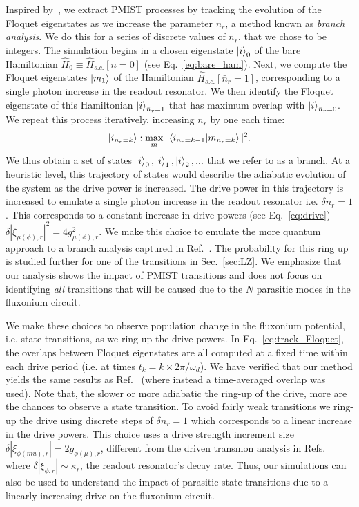 \documentclass[%
reprint,
superscriptaddress,
 amsmath,amssymb,
 aps,
 prx,
longbibliography,
floatfix,
]{revtex4-2}
\begin{document}
Inspired by~\cite{dumas2024unified,cohen2023reminiscence}, we extract PMIST processes by tracking the evolution of  the Floquet eigenstates as we increase the parameter $\bar{n}_r$, a method known as \emph{branch analysis}. 
We do this for a series of discrete values of $\bar{n}_r$, that we chose to be integers.  The simulation begins in a chosen eigenstate $\ket{i}_0$ of the bare Hamiltonian $\hat{H}_0 \equiv \hat{H}_{s.c.}[\bar{n}=0]$ (see Eq.~\ref{eq:bare_ham}). 
Next, we compute the Floquet eigenstates $\ket{m_1}$ of the Hamiltonian $\hat{H}_{s.c.}[\bar{n}_r=1]$,
corresponding to a single photon increase in the readout resonator. We then identify the Floquet eigenstate of this Hamiltonian $\ket{i}_{\bar n_r=1}$ that has maximum overlap with $\ket{i}_{\bar n_r=0}$.  We repeat this process iteratively, increasing $\bar{n}_r$ by one each time:
\begin{align}
\ket{i_{\bar n_r=k}}:\max_{m}|\braket{i_{\bar n_r=k-1}|{m}_{\bar n_r=k}}|^2.\label{eq:track_Floquet}   
\end{align}
We thus obtain a set of states $\ket{i}_0,\ket{i}_1,\ket{i}_2,...$ that we refer to as a branch.  At a heuristic level, this trajectory of states would describe the adiabatic evolution of the system as the drive power is increased. The drive power in this trajectory is increased to emulate a single photon increase in the readout resonator i.e. $\delta \bar n_r=1$. This corresponds to a constant increase in drive powers (see Eq.~\ref{eq:drive}) $\delta |\xi_{\mu (\phi),r}|^2=4g_{\mu (\phi),r}^2$. We make this choice to emulate the more quantum approach to a branch analysis captured in Ref.~\cite{shillito2022dynamics,dumas2024unified}. The probability for this ring up is studied further for one of the transitions in Sec.~\ref{sec:LZ}. We emphasize that our analysis shows the impact of PMIST transitions and does not focus on identifying \emph{all} transitions that will be caused due to the $N$ parasitic modes in the fluxonium circuit.



We make these choices to observe population change in the fluxonium potential, i.e. state transitions, as we ring up the drive powers. In Eq.~\ref{eq:track_Floquet}, the overlaps between Floquet eigenstates are all computed at a fixed time within each drive period (i.e. at times $t_k = k \times 2 \pi / \omega_d$).  We have verified that our method yields the same results as Ref.~\cite{dumas2024unified} (where instead a time-averaged overlap was used). Note that, the slower or more adiabatic the ring-up of the drive, more are the chances to observe a state transition. To avoid fairly weak transitions we ring-up the drive using discrete steps of $\delta \bar n_r=1$ which corresponds to a linear increase in the drive powers. This choice uses a drive strength increment size $\delta 
|{\xi}_{\phi (
mu
),r}|= 2g_{
\phi(\mu),r} 
$, different from the driven transmon analysis in Refs.~\cite{dumas2024unified} where $\delta 
|{\xi}_{\phi,r}|\sim \kappa_r$, the readout resonator's decay rate. Thus, our simulations can also be used to understand the impact of parasitic state transitions due to a linearly increasing drive on the fluxonium circuit.
\end{document}
